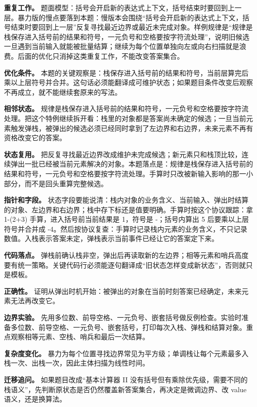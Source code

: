 \textbf{重复工作。} 题面模型：括号会开启新的表达式上下文，括号结束时要回到上一层。暴力版的慢点要落到本题：慢版本会围绕“括号会开启新的表达式上下文，括号结束时要回到上一层”反复寻找最近边界或最近未完成对象。样例规律是“规律是栈保存进入括号前的结果和符号，一元负号和空格要按字符流处理”，说明旧候选一旦遇到当前输入就能被批量结算；继续为每个位置单独向左或向右扫描就是浪费。后面的优化只消掉这类重复工作，不能改变答案集合。

\textbf{优化条件。} 本题的关键观察是：栈保存进入括号前的结果和符号，当前层算完后乘以上层符号并合并。这句话必须能翻译成可维护状态；如果题目条件改变后观察不再成立，就不能继续套原来的写法。

\textbf{相邻状态。} 规律是栈保存进入括号前的结果和符号，一元负号和空格要按字符流处理。把这个特例继续拆开看：栈里的对象都是答案尚未确定的候选；一旦当前元素触发弹栈，被弹出的候选必须已经同时拿到了左边界和右边界，未来元素不再有资格改变它的答案。

\textbf{状态复用。} 把反复寻找最近边界改成维护未完成候选；新元素只和栈顶比较，连续弹出一批已经被当前元素解决的对象。本题落点是：规律是栈保存进入括号前的结果和符号，一元负号和空格要按字符流处理。手算时只改被新输入影响的那一小部分，而不是回头重算完整候选。

\textbf{指针和字段。} 状态字段要能说清：栈内对象的业务含义、当前输入、弹出时结算的对象、左边界和右边界；栈中存下标还是值要明确。手算时按这个协议跟踪：拿 1-(2+3) 手算，进入括号前当前结果是 1，符号是 -；括号内算出 5 后要乘以上层符号并合并成 -4。然后按协议复查：手算时记录栈内元素的业务含义，不只记录数值。入栈表示答案未定，弹栈表示当前事件已经让它的答案定下来。

\textbf{代码落点。} 弹栈前确认栈非空，弹出后再读取新的左边界；相等元素和哨兵高度要有统一策略。关键代码行必须能逐句翻译成“旧状态怎样变成新状态”，否则就只是模板。

\textbf{正确性。} 证明从弹出时机开始：被弹出的对象在当前时刻答案已经确定，未来元素无法再改变它。

\textbf{边界实验。} 先用多位数、前导空格、一元负号、嵌套括号做反例检查。实验时准备多位数、前导空格、一元负号、嵌套括号，打印每次入栈、弹栈和结算对象。重点观察相等元素、空栈、哨兵和最后一次结算。

\textbf{复杂度变化。} 暴力为每个位置寻找边界常见为平方级；单调栈让每个元素最多入栈一次、出栈一次，因此主体扫描为线性时间。

\textbf{迁移追问。} 如果题目改成“基本计算器 II 没有括号但有乘除优先级，需要不同的栈语义”，先判断原状态是否仍然覆盖新答案集合，再决定是微调边界、改 value 语义，还是换算法。

